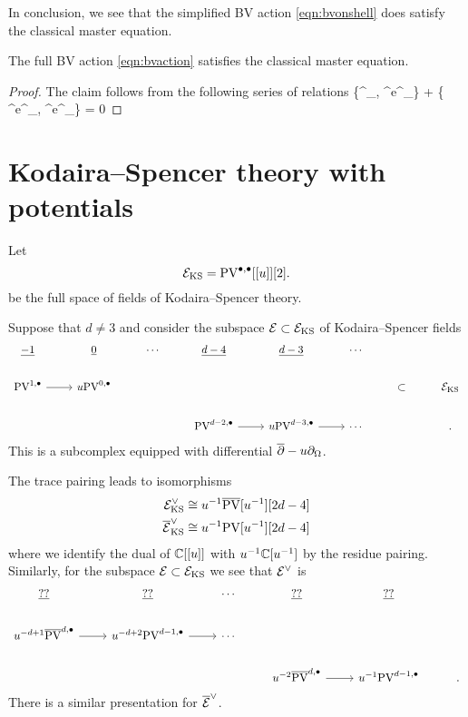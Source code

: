 \documentclass[11pt]{amsart}
\numberwithin{equation}{section}
\def\PV{{\rm PV}}
\def\div{\partial_\Omega}
\begin{document}
In conclusion, we see that the simplified BV action \ref{eqn:bvonshell} does satisfy the classical master equation.

\begin{prop}
The full BV action \eqref{eqn:bvaction} satisfies the classical master equation.
\end{prop}
\begin{proof}
The claim follows from the following series of relations
\beqn\label{eqn:cme1}
\left\{\int^\Omega \beta \div \mu, \int^\Omega e^\nu \mu \wedge \mu \wedge \div \gamma\right\} + \left\{ \int^\Omega e^\nu \mu \wedge \mu \wedge \div \gamma,  \int^\Omega e^\nu \mu \wedge \mu \wedge \div \gamma \right\} = 0
\eeqn
\end{proof}

\section{Kodaira--Spencer theory with potentials}

Let
\[
\cE_{\rm KS} = \PV^{\bu,\bu} [[u]] [2] .
\]
be the full space of fields of Kodaira--Spencer theory. 

Suppose that $d \ne 3$ and consider the subspace $\mathcal E \subset \mathcal E_{\rm KS}$ of Kodaira--Spencer fields
\[
\begin{tikzcd}
\ul{-1} & \ul{0} & \cdots & \ul{d-4} & \ul{d-3} & \cdots &&  \\
\PV^{1,\bu} \ar[r] & u\PV^{0,\bu} & & & & & \subset & \cE_{\rm KS} \\
& & & \PV^{d-2, \bu} \ar[r] & u \PV^{d-3, \bu} \ar[r] & \cdots & &  .
\end{tikzcd}
\]
This is a subcomplex equipped with differential $\dbar - u \div$. 

The trace pairing leads to isomorphisms
\begin{align*}
\cE^\vee_{\rm KS} & \cong u^{-1} \Bar{\PV} [u^{-1}] [2d-4] \\
\Bar{\cE}^\vee_{\rm KS} & \cong u^{-1} \PV [u^{-1}] [2d-4]
\end{align*} 
where we identify the dual of $\mathbb C[[u]]$ with $u^{-1} \mathbb C[u^{-1}]$ by the residue pairing. 
Similarly, for the subspace $\mathcal E \subset \mathcal E_{\rm KS}$ we see that $\mathcal E^\vee$ is 
\[
\begin{tikzcd}
\ul{??} & \ul{??} & \cdots & \ul{??} & \ul{??}  \\
u^{-d+1}\Bar{\PV}^{d,\bu} \ar[r] & u^{-d+2}\PV^{d-1,\bu} \ar[r] & \cdots & & & \\
& & & u^{-2} \Bar{\PV}^{d, \bu} \ar[r] & u^{-1} \PV^{d-1, \bu} & .
\end{tikzcd}
\]
There is a similar presentation for $\overline{\mathcal E}^\vee$. 
\end{document}
